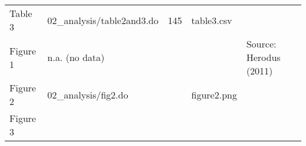 \documentclass[
]{article}
\begin{document}
\begin{longtable}[]{@{}lllll@{}}
\begin{minipage}[t]{0.13\columnwidth}
Table 3\strut
\end{minipage} & \begin{minipage}[t]{0.35\columnwidth}\raggedright
02\_analysis/table2and3.do\strut
\end{minipage} & \begin{minipage}[t]{0.09\columnwidth}\raggedright
145\strut
\end{minipage} & \begin{minipage}[t]{0.20\columnwidth}\raggedright
table3.csv\strut
\end{minipage} & \begin{minipage}[t]{0.15\columnwidth}\raggedright
\strut
\end{minipage}\tabularnewline
\begin{minipage}[t]{0.13\columnwidth}\raggedright
Figure 1\strut
\end{minipage} & \begin{minipage}[t]{0.35\columnwidth}\raggedright
n.a. (no data)\strut
\end{minipage} & \begin{minipage}[t]{0.09\columnwidth}\raggedright
\strut
\end{minipage} & \begin{minipage}[t]{0.20\columnwidth}\raggedright
\strut
\end{minipage} & \begin{minipage}[t]{0.15\columnwidth}\raggedright
Source: Herodus (2011)\strut
\end{minipage}\tabularnewline
\begin{minipage}[t]{0.13\columnwidth}\raggedright
Figure 2\strut
\end{minipage} & \begin{minipage}[t]{0.35\columnwidth}\raggedright
02\_analysis/fig2.do\strut
\end{minipage} & \begin{minipage}[t]{0.09\columnwidth}\raggedright
\strut
\end{minipage} & \begin{minipage}[t]{0.20\columnwidth}\raggedright
figure2.png\strut
\end{minipage} & \begin{minipage}[t]{0.15\columnwidth}\raggedright
\strut
\end{minipage}\tabularnewline
\begin{minipage}[t]{0.13\columnwidth}\raggedright
Figure 3\strut
\end{minipage} & \begin{minipage}[t]{0.35\columnwidth}\raggedright

\end{minipage}
\end{longtable}
\end{document}
